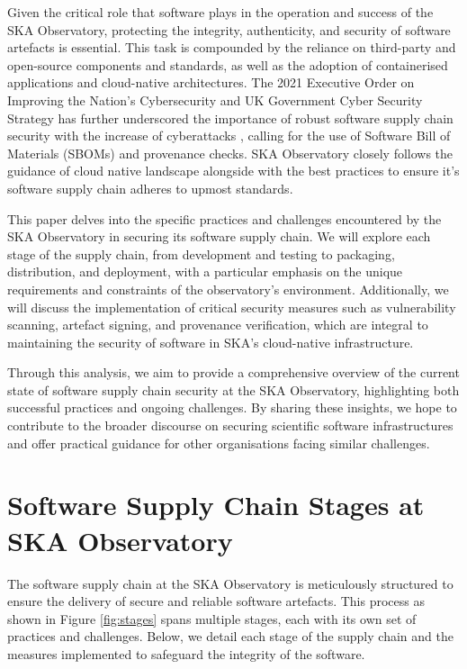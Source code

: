 \documentclass[a4paper]{spie}  %
\begin{document}
Given the critical role that software plays in the operation and success of the SKA Observatory, protecting the integrity, authenticity, and security of software artefacts is essential. This task is compounded by the reliance on third-party and open-source components and standards, as well as the adoption of containerised applications and cloud-native architectures. The 2021 Executive Order on Improving the Nation's Cybersecurity\cite{ExecutiveOrder14028} and UK Government Cyber Security Strategy\cite{GovernmentCyberSecurity} has further underscored the importance of robust software supply chain security with the increase of cyberattacks \cite{cremerCyberRiskCybersecurity2022}, calling for the use of Software Bill of Materials (SBOMs) and provenance checks. SKA Observatory closely follows the guidance of cloud native landscape alongside with the best practices to ensure it's software supply chain adheres to upmost standards.\cite{CybersecurityFramework2013}

This paper delves into the specific practices and challenges encountered by the SKA Observatory in securing its software supply chain. We will explore each stage of the supply chain, from development and testing to packaging, distribution, and deployment, with a particular emphasis on the unique requirements and constraints of the observatory's environment. Additionally, we will discuss the implementation of critical security measures such as vulnerability scanning, artefact signing, and provenance verification, which are integral to maintaining the security of software in SKA's cloud-native infrastructure.

Through this analysis, we aim to provide a comprehensive overview of the current state of software supply chain security at the SKA Observatory, highlighting both successful practices and ongoing challenges. By sharing these insights, we hope to contribute to the broader discourse on securing scientific software infrastructures and offer practical guidance for other organisations facing similar challenges.

\section{Software Supply Chain Stages at SKA Observatory}

The software supply chain at the SKA Observatory is meticulously structured to ensure the delivery of secure and reliable software artefacts. This process as shown in Figure \ref{fig:stages} spans multiple stages, each with its own set of practices and challenges. Below, we detail each stage of the supply chain and the measures implemented to safeguard the integrity of the software.
\end{document}
